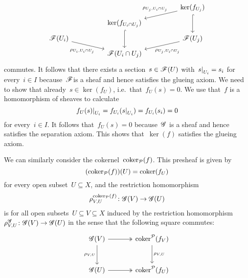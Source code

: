 \begin{example}
\begin{enumerate}
\begin{enumerate}[label=(S\arabic*)]
\[\begin{tikzcd}[column sep = huge, row sep = tiny]
              & {}
              & \ker(f_{U_j})
                \arrow{dl}[above left, near start]{\rho_{U_j, U_i \cap U_j}}
                \arrow[hook]{dd}
              \\
                {}
              & \ker(f_{U_i \cap U_j})
                \arrow[hook]{dd}
              & {}
              \\
                \Fs(U_i)
                \arrow{dr}[below left, near end]{\rho_{U_i, U_i \cap U_j}}
              & {}
              & \Fs(U_j)
                \arrow{dl}[below right, near end]{\rho_{U_j, U_i \cap U_j}}
              \\
                {}
              & \Fs(U_i \cap U_j)
              & {}
            \end{tikzcd}
          \]
          commutes.
          It follows that there exists a section~$s \in \mathscr{F}(U)$ with~$\restrict{s}{U_i} = s_i$ for every~$i \in I$ because~$\mathscr{F}$is a sheaf and hence satisfies the glueing axiom.
          We need to show that already~$s \in \ker(f_U)$, i.e.\ that~$f_U(s) = 0$.
          We use that~$f$ is a homomorphism of sheaves to calculate
          \[
              \restrict{f_U(s)}{U_i}
            = f_{U_i}( \restrict{s}{U_i} )
            = f_{U_i}(s_i)
            = 0
          \]
          for every~$i \in I$.
          It follows that~$f_U(s) = 0$ because~$\mathscr{G}$ is a sheaf and hence satisfies the separation axiom.
          This shows that~$\ker(f)$ satisfies the glueing axiom.
      \end{enumerate}
      
      We can similarly consider the cokernel~$\operatorname{coker}_{\mathcal{P}}(f)$.
      This presheaf is given by
      \[
        (\operatorname{coker}_{\mathcal{P}}(f))(U) = \operatorname{coker}(f_U)
      \]
      for every open subset~$U \subseteq X$, and the restriction homomorphism
      \[
                \rho^{\operatorname{coker}_{\mathcal{P}}(f)}_{V,U}
        \colon  \mathscr{G}(V)
        \to     \mathscr{G}(U)
      \]
      is for all open subsets~$U \subseteq V \subseteq X$ induced by the restriction homomorphism~$\rho^{\mathscr{G}}_{V,U} \colon \mathscr{G}(V) \to \mathscr{G}(U)$ in the sense that the following square commutes:
      \[
        \begin{tikzcd}[sep = large]
            \Gs(V)
            \arrow[two heads]{r}
            \arrow{d}[left]{\rho_{V,U}}
          & \coker^{\Pcat}(f_V)
            \arrow{d}[right]{\rho_{V,U}}
          \\
            \Gs(U)
            \arrow[two heads]{r}
          & \coker^{\Pcat}(f_U)
        \end{tikzcd}
      \]
      

\end{enumerate}
\end{example}
